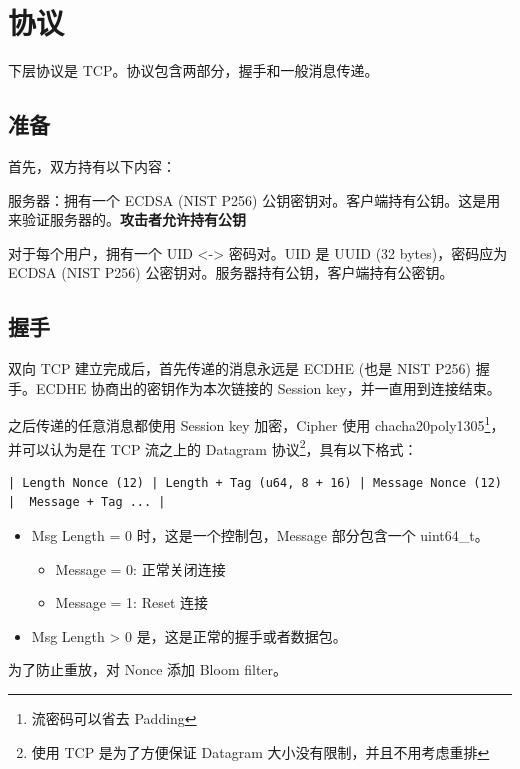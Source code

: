 \documentclass{ctexart}
\begin{document}
  \section{协议}

  下层协议是 TCP。协议包含两部分，握手和一般消息传递。

  \subsection{准备}

  首先，双方持有以下内容：
  
  服务器：拥有一个 ECDSA (NIST P256) 公钥密钥对。客户端持有公钥。这是用来验证服务器的。\textbf{攻击者允许持有公钥}

  对于每个用户，拥有一个 UID <-> 密码对。UID 是 UUID (32 bytes)，密码应为 ECDSA (NIST P256) 公密钥对。服务器持有公钥，客户端持有公密钥。

  \subsection{握手}

  双向 TCP 建立完成后，首先传递的消息永远是 ECDHE (也是 NIST P256) 握手。ECDHE 协商出的密钥作为本次链接的 Session key，并一直用到连接结束。
  
  之后传递的任意消息都使用 Session key 加密，Cipher 使用 chacha20poly1305\footnote{流密码可以省去 Padding}，并可以认为是在 TCP 流之上的 Datagram 协议\footnote{使用 TCP 是为了方便保证 Datagram 大小没有限制，并且不用考虑重排}，具有以下格式：

  \begin{verbatim}
| Length Nonce (12) | Length + Tag (u64, 8 + 16) | Message Nonce (12) |  Message + Tag ... |
  \end{verbatim}

  \begin{itemize}
    \item Msg Length = 0 时，这是一个控制包，Message 部分包含一个 uint64\_t。
    \begin{itemize}
      \item Message = 0: 正常关闭连接
      \item Message = 1: Reset 连接
    \end{itemize}
    \item Msg Length > 0 是，这是正常的握手或者数据包。
  \end{itemize} 

  为了防止重放，对 Nonce 添加 Bloom filter。
\end{document}

